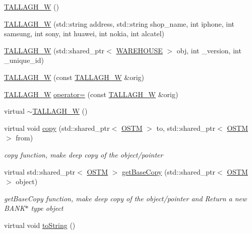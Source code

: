\begin{DoxyCompactItemize}
\item 
\hyperlink{class_t_a_l_l_a_g_h___w_aeafc411edee7a3e8bfcc54fa478e2104}{T\+A\+L\+L\+A\+G\+H\+\_\+W} ()
\item 
\hyperlink{class_t_a_l_l_a_g_h___w_a2d61c90d6ff2f1b50f81a3ce6506e285}{T\+A\+L\+L\+A\+G\+H\+\_\+W} (std\+::string address, std\+::string shop\+\_\+name, int iphone, int samsung, int sony, int huawei, int nokia, int alcatel)
\item 
\hyperlink{class_t_a_l_l_a_g_h___w_a34d0767d7e66f28b1e9725c27f964a9c}{T\+A\+L\+L\+A\+G\+H\+\_\+W} (std\+::shared\+\_\+ptr$<$ \hyperlink{class_w_a_r_e_h_o_u_s_e}{W\+A\+R\+E\+H\+O\+U\+SE} $>$ obj, int \+\_\+version, int \+\_\+unique\+\_\+id)
\item 
\hyperlink{class_t_a_l_l_a_g_h___w_a92cfa48ee385c9299427e4fa95b57003}{T\+A\+L\+L\+A\+G\+H\+\_\+W} (const \hyperlink{class_t_a_l_l_a_g_h___w}{T\+A\+L\+L\+A\+G\+H\+\_\+W} \&orig)
\item 
\hyperlink{class_t_a_l_l_a_g_h___w}{T\+A\+L\+L\+A\+G\+H\+\_\+W} \hyperlink{class_t_a_l_l_a_g_h___w_a0ac3db0bae78cc4e59f175e90374ed50}{operator=} (const \hyperlink{class_t_a_l_l_a_g_h___w}{T\+A\+L\+L\+A\+G\+H\+\_\+W} \&orig)
\item 
virtual \hyperlink{class_t_a_l_l_a_g_h___w_aad3a2ca2d942a0629716b1c9f446931f}{$\sim$\+T\+A\+L\+L\+A\+G\+H\+\_\+W} ()
\item 
virtual void \hyperlink{class_t_a_l_l_a_g_h___w_a7cd62cf694fbe8c6242916f26df8f6ca}{copy} (std\+::shared\+\_\+ptr$<$ \hyperlink{class_o_s_t_m}{O\+S\+TM} $>$ to, std\+::shared\+\_\+ptr$<$ \hyperlink{class_o_s_t_m}{O\+S\+TM} $>$ from)
\begin{DoxyCompactList}\small\item\em copy function, make deep copy of the object/pointer \end{DoxyCompactList}\item 
virtual std\+::shared\+\_\+ptr$<$ \hyperlink{class_o_s_t_m}{O\+S\+TM} $>$ \hyperlink{class_t_a_l_l_a_g_h___w_a51957c778c31d56f98febdf294f88a4c}{get\+Base\+Copy} (std\+::shared\+\_\+ptr$<$ \hyperlink{class_o_s_t_m}{O\+S\+TM} $>$ object)
\begin{DoxyCompactList}\small\item\em get\+Base\+Copy function, make deep copy of the object/pointer and Return a new B\+A\+N\+K$\ast$ type object \end{DoxyCompactList}\item 
virtual void \hyperlink{class_t_a_l_l_a_g_h___w_ac7a438b7511cf2931490e6b44eff4a49}{to\+String} ()

\end{DoxyCompactItemize}
